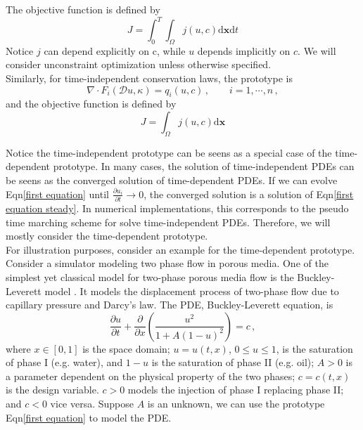 \documentclass[a4paper,onecolumn]{article}
\theoremstyle{remark}
\begin{document}
\noindent The objective function is defined by
\begin{equation}
    J = \int_0^T \int_\Omega j(u,c) \textrm{d}\mathbf{x}\textrm{d}t
    \label{obj prototype}
\end{equation}
Notice $j$ can depend explicitly on c, while $u$ depends implicitly on $c$.
We will consider unconstraint optimization unless otherwise specified.\\

\noindent Similarly, for time-independent conservation laws, the prototype is
\begin{equation}
    \nabla \cdot 
    F_i(\mathcal{D} u, \kappa) 
    = q_i(u,c)\,, \qquad i=1,\cdots, n\,,
    \label{first equation steady}
\end{equation}
and the objective function is defined by
\begin{equation}
    J = \int_\Omega j(u,c) \textrm{d}\mathbf{x}
\end{equation}

\noindent Notice the time-independent prototype can be seens as a special case 
of the time-dependent prototype. In many cases, the solution of time-independent PDEs
can be seens as the converged solution of time-dependent PDEs. If we can evolve 
Eqn\eqref{first equation} until $\frac{\partial u_i}{\partial t}\rightarrow 0$,
the converged solution is a solution of Eqn\eqref{first equation steady}.
In numerical implementations, this corresponds to the pseudo time marching scheme
for solve time-independent PDEs. Therefore, we will mostly consider the time-dependent 
prototype.\\

\noindent For illustration purposes, 
consider an example for the time-dependent prototype. Consider 
a simulator modeling two phase flow in porous media.
One of the simplest yet classical model for two-phase porous media flow is the Buckley-Leverett model \cite{Buckley Leverett, Reservoir Simulation Book}. 
It models the displacement process of two-phase flow due to capillary pressure and Darcy's law.
The PDE, Buckley-Leverett equation, is
\begin{equation}
    \frac{\partial u}{\partial t} + \frac{\partial}{\partial x} \left(\frac{u^2}{1+A(1-u)^2}\right) = c\,,
    \label{Buck-Lev eqn}
\end{equation}
where $x\in[0,1]$ is the space domain;
$u = u(t,x)$, $0\le u\le 1$, is the saturation of phase I (e.g. water), 
and $1-u$ is the saturation of phase II (e.g. oil);
$A>0$ is a parameter dependent on the physical property of the two phases;
$c=c(t,x)$ is the design variable. $c>0$ models the injection of phase I replacing phase II; and $c<0$ vice versa.
Suppose $A$ is an unknown, we can use the prototype Eqn\eqref{first equation} to 
model the PDE.\\
\end{document}

